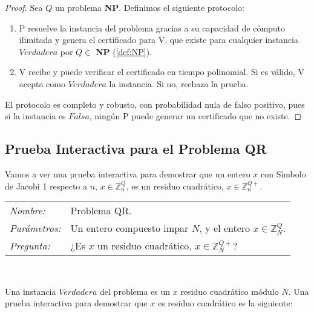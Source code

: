 \begin{proof}
	Sea $Q$ un problema \textbf{NP}. Definimos el siguiente protocolo:

	\begin{enumerate}
		\item  P resuelve la instancia del problema gracias a su capacidad de cómputo ilimitada y genera el certificado para V, que existe para cualquier instancia $Verdadera$ por $Q\in$ \textbf{NP} (\ref{def:NP}).
		\item  V recibe y puede verificar el certificado en tiempo polinomial. Si es válido, V acepta como $Verdadera$ la instancia. Si no, rechaza la prueba.
	\end{enumerate}

	El protocolo es completo y robusto, con probabilidad nula de falso positivo, pues si la instancia es $Falsa$, ningún P puede generar un certificado que no existe.

\end{proof}



\subsection{Prueba Interactiva para el Problema QR}

Vamos a ver una prueba interactiva para demostrar que un entero $x$ con Símbolo de Jacobi 1 respecto a $n$, $x \in \mathbb{Z}^Q_n$, es un residuo cuadrático, $x \in \mathbb{Z}^{Q+}_n$.

\hfil

\begin{tabular}{|ll}
	\textit{Nombre:} & Problema QR. \\
	\textit{Parámetros:} &Un entero compuesto impar $N$, y el entero $x\in \mathbb{Z}^Q_N$. \\
	\textit{Pregunta:} & ¿Es $x$ un residuo cuadrático, $x \in \mathbb{Z}^{Q+}_N$? \\
\end{tabular}
\\

\hfil

Una instancia $Verdadera$ del problema es un $x$ residuo cuadrático módulo $N$. Una prueba interactiva para demostrar que $x$ es residuo cuadrático es la siguiente:

\hfil

